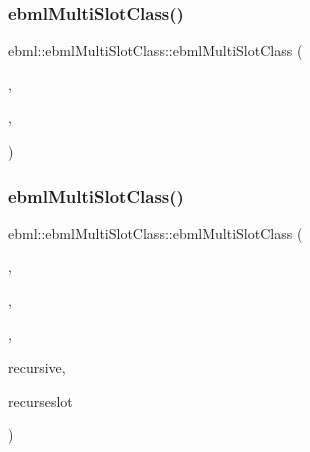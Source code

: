 \subsubsection{\texorpdfstring{ebml\+Multi\+Slot\+Class()}{ebmlMultiSlotClass()}\hspace{0.1cm}{\footnotesize\ttfamily [1/4]}}
{\footnotesize\ttfamily ebml\+::ebml\+Multi\+Slot\+Class\+::ebml\+Multi\+Slot\+Class (\begin{DoxyParamCaption}\item[{const char $\ast$}]{,  }\item[{const std\+::wstring \&}]{,  }\item[{const \mbox{\hyperlink{namespaceebml_abdc1248164e4e424423defac9fff7d4d}{slot\+Spec\+\_\+l}} \&}]{ }\end{DoxyParamCaption})}

\mbox{\label{classebml_1_1ebmlMultiSlotClass_a455cc78a25f193348d71a2f7f079dd98}} 
\subsubsection{\texorpdfstring{ebml\+Multi\+Slot\+Class()}{ebmlMultiSlotClass()}\hspace{0.1cm}{\footnotesize\ttfamily [2/4]}}
{\footnotesize\ttfamily ebml\+::ebml\+Multi\+Slot\+Class\+::ebml\+Multi\+Slot\+Class (\begin{DoxyParamCaption}\item[{const char $\ast$}]{,  }\item[{const std\+::wstring \&}]{,  }\item[{const \mbox{\hyperlink{namespaceebml_abdc1248164e4e424423defac9fff7d4d}{slot\+Spec\+\_\+l}} \&}]{,  }\item[{const \mbox{\hyperlink{structebml_1_1occurSpec__t}{occur\+Spec\+\_\+t}} \&}]{recursive,  }\item[{size\+\_\+t}]{recurseslot }\end{DoxyParamCaption})}

\mbox{\label{classebml_1_1ebmlMultiSlotClass_ac96d2f773a6c8e18731732c97a783fe6}} 
